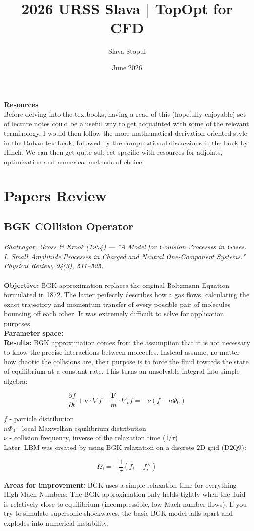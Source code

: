 \documentclass{article}
\title{2026 URSS Slava | TopOpt for CFD}
\author{Slava Stopul}
\date{June 2026}
\begin{document}
\maketitle

\textbf{Resources} \\
Before delving into the textbooks, having a read of this (hopefully enjoyable) set of \href{https://cbeaume.com/download/FFM.pdf}{lecture notes} could be a useful way to get acquainted with some of the relevant terminology. I would then follow the more mathematical derivation-oriented style in the Ruban textbook, followed by the computational discussions in the book by Hinch. We can then get quite subject-specific with resources for adjoints, optimization and numerical methods of choice. 

\section{Papers Review}

\subsection{BGK COllision Operator}
\textit{Bhatnagar, Gross \& Krook (1954) — "A Model for Collision Processes in Gases. I. Small Amplitude Processes in Charged and Neutral One-Component Systems." Physical Review, 94(3), 511–525.} \\
\\
\textbf{Objective:} BGK approximation replaces the original Boltzmann Equation formulated in 1872. The latter perfectly describes how a gas flows, calculating the exact trajectory and momentum transfer of every possible pair of molecules bouncing off each other. It was extremely difficult to solve for application purposes. \\
\textbf{Parameter space:} \\
\textbf{Results:} BGK approximation comes from the assumption that it is not necessary to know the precise interactions between molecules. Instead assume, no matter how chaotic the collisions are, their purpose is to force the fluid towards the state of equilibrium at a constant rate. This turns an unsolvable integral into simple algebra: 

$$\frac{\partial f}{\partial t} + \mathbf{v} \cdot \nabla f + \frac{\mathbf{F}}{m} \cdot \nabla_v f = -\nu (f - n \Phi_0)$$

$f$ - particle distribution \\
$n \Phi_0$ - local Maxwellian equilibrium distribution \\
$\nu$ - collision frequency, inverse of the relaxation time ($1/\tau$) \\

Later, LBM was created by using BGK relaxation on a discrete 2D grid (D2Q9):

$$\Omega_i = -\frac{1}{\tau} (f_i - f_i^{eq})$$

\textbf{Areas for improvement:} BGK uses a simple relaxation time for everything 
High Mach Numbers: The BGK approximation only holds tightly when the fluid is relatively close to equilibrium (incompressible, low Mach number flows). If you try to simulate supersonic shockwaves, the basic BGK model falls apart and explodes into numerical instability.
\end{document}
